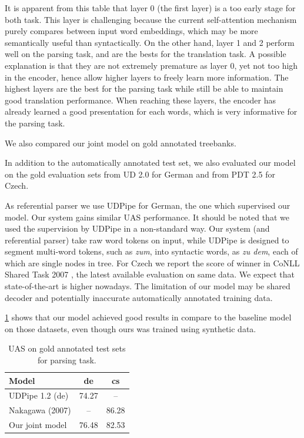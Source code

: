 It is apparent from this table that layer 0 (the first layer) is a too early
stage for both task. This layer is challenging because the current
self-attention mechanism purely compares between input word embeddings, which
may be more semantically useful than syntactically. On the other hand, layer
1 and 2 perform well on the parsing task, and are the bests for the translation
task. A possible explanation is that they are not extremely premature as layer
0, yet not too high in the encoder, hence allow higher layers to freely learn
more information. The highest layers are the best for the parsing task while
still be able to maintain good translation performance. When reaching these
layers, the encoder has already learned a good presentation for each words,
which is very informative for the parsing task.

We also compared our joint model on gold annotated treebanks.

In addition to the automatically annotated test set, we also evaluated our model on the gold evaluation sets
from UD 2.0 for German and from PDT 2.5 for Czech.

As referential parser we use UDPipe for German, the one which supervised our model.
Our system gains similar UAS performance. It should be noted that we used
the supervision by UDPipe in a non-standard way. Our system (and referential
parser) take raw word tokens on input, while
UDPipe is designed to segment multi-word tokens, such as \textit{zum}, into
syntactic words, as \textit{zu dem}, each of which are single nodes in tree.
For Czech we report the score of winner in
CoNLL Shared Task 2007 , the latest available evaluation 
on same data. We expect that state-of-the-art is higher nowadays. The
limitation of our model may be shared decoder and potentially inaccurate
automatically annotated training data.

\cref{multidec-results-parse} shows that our model achieved good results in compare to the baseline model on those datasets, even though ours was trained using synthetic data.

\begin{table}
\begin{center}
\small
\begin{tabular}{lcc}
\textbf{Model}        	& \textbf{de}	& \textbf{cs}	\\
\hline
UDPipe 1.2 (de) 		& 74.27 & -- \\ %
Nakagawa (2007) 		& -- &  86.28 \\
Our joint model			& 76.48	&  82.53 \\
\end{tabular}
\end{center}
\caption{UAS on gold annotated test sets for parsing task.}
\label{multidec-results-parse}
\end{table}

